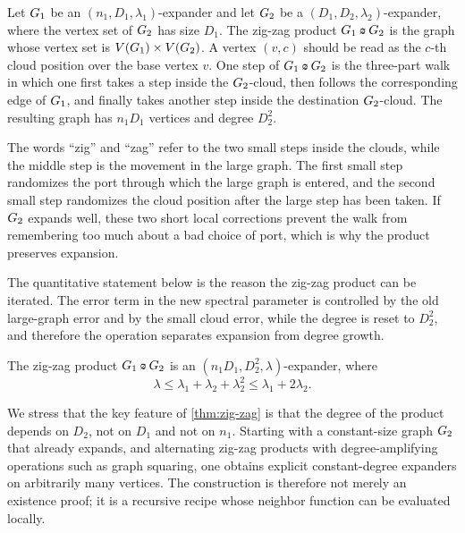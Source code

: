 \begin{definition}
	\label{def:zig-zag}
	Let \(G_1\) be an \((n_1,D_1,\lambda_1)\)-expander and let \(G_2\) be a \((D_1,D_2,\lambda_2)\)-expander, where the vertex set of \(G_2\) has size \(D_1\). The zig-zag product \(\Graph_1 \zzprod \Graph_2\) is the graph whose vertex set is \(V(G_1)\times V(G_2)\). A vertex \((v,c)\) should be read as the \(c\)-th cloud position over the base vertex \(v\). One step of \(\Graph_1 \zzprod \Graph_2\) is the three-part walk in which one first takes a step inside the \(G_2\)-cloud, then follows the corresponding edge of \(G_1\), and finally takes another step inside the destination \(G_2\)-cloud. The resulting graph has \(n_1D_1\) vertices and degree \(D_2^2\).
\end{definition}

The words ``zig'' and ``zag'' refer to the two small steps inside the clouds, while the middle step is the movement in the large graph. The first small step randomizes the port through which the large graph is entered, and the second small step randomizes the cloud position after the large step has been taken. If \(G_2\) expands well, these two short local corrections prevent the walk from remembering too much about a bad choice of port, which is why the product preserves expansion.

The quantitative statement below is the reason the zig-zag product can be iterated. The error term in the new spectral parameter is controlled by the old large-graph error and by the small cloud error, while the degree is reset to \(D_2^2\), and therefore the operation separates expansion from degree growth.

\begin{theorem}
	\label{thm:zig-zag}
	The zig-zag product \(\Graph_1 \zzprod \Graph_2\) is an \((n_1D_1,D_2^2,\lambda)\)-expander, where
	\begin{equation}
		\label{eq:zig-zag-spectral-bound}
		\lambda\leq \lambda_1+\lambda_2+\lambda_2^2\leq \lambda_1+2\lambda_2.
	\end{equation}
\end{theorem}

We stress that the key feature of \cref{thm:zig-zag} is that the degree of the product depends on \(D_2\), not on \(D_1\) and not on \(n_1\). Starting with a constant-size graph \(G_2\) that already expands, and alternating zig-zag products with degree-amplifying operations such as graph squaring, one obtains explicit constant-degree expanders on arbitrarily many vertices. The construction is therefore not merely an existence proof; it is a recursive recipe whose neighbor function can be evaluated locally.

